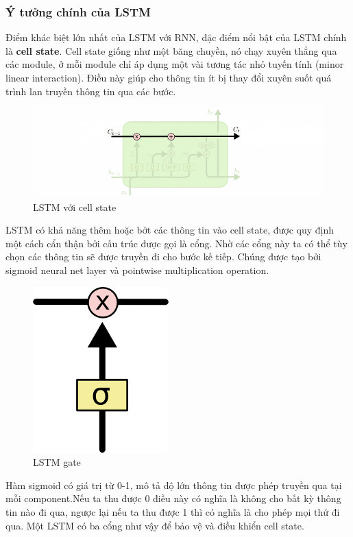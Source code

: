 \documentclass[a4paper,12pt]{report}
\begin{document}
\subsubsection{Ý tưởng chính của LSTM}
\par Điểm khác biệt lớn nhất của LSTM với RNN, đặc điểm nổi bật của LSTM chính là \textbf{cell state}. Cell state giống như một băng chuyền, nó chạy xuyên thẳng qua các module, ở mỗi module chỉ áp dụng một vài tương tác nhỏ tuyến tính (minor linear interaction). Điều này giúp cho thông tin ít bị thay đổi xuyên suốt quá trình lan truyền thông tin qua các bước.
\begin{figure}[H]
\centering
\includegraphics[scale=0.5]{lstm_cellstate.png}
\caption{LSTM với cell state}
\end{figure}
\par LSTM có khả năng thêm hoặc bớt các thông tin vào cell state, được quy định một cách cẩn thận bởi cấu trúc được gọi là cổng. Nhờ các cổng này ta có thể tùy chọn các thông tin sẽ được truyền đi cho bước kế tiếp. Chúng được tạo bởi sigmoid neural net layer và pointwise multiplication operation.
\begin{figure}[H]
\centering
\includegraphics[scale=0.5]{lstm_gate.png}
\caption{LSTM gate}
\end{figure}
\par Hàm sigmoid có giá trị từ 0-1, mô tả độ lớn thông tin được phép truyền qua tại mỗi component.Nếu ta thu được 0 điều này có nghĩa là không cho bất kỳ thông tin nào đi qua, ngược lại nếu ta thu được 1 thì có nghĩa là cho phép mọi thứ đi qua. Một LSTM có ba cổng như vậy để bảo vệ và điều khiển cell state.
\end{document}
